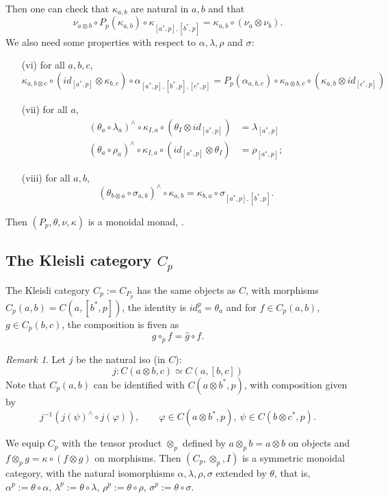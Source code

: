 \documentclass[12pt]{article}
\theoremstyle{definition}
\theoremstyle{remark}
\newtheorem{remark}{Remark}
\begin{document}
Then one can check that $\kappa_{a,b}$ are natural in $a,b$ and that 
\[
\nu_{a\otimes b}\circ P_p(\kappa_{a,b})\circ
\kappa_{[a^*,p],[b^*,p]}=\kappa_{a,b}\circ(\nu_a\otimes \nu_b).
\]
We also need some properties with respect to $\alpha,\lambda,\rho$ and $\sigma$:
\begin{enumerate}
\item[(vi)] for all $a,b,c$,
\[
\kappa_{a,b\otimes c}\circ
(id_{[a^*,p]}\otimes\kappa_{b,c})\circ\alpha_{[a^*,p],[b^*,p],[c^*,p]}=P_p(\alpha_{a,b,c})\circ\kappa_{a\otimes
b,c}\circ(\kappa_{a,b}\otimes id_{[c^*,p]})
\]
\item[(vii)] for all $a$,
\begin{align*}
(\theta_a\circ \lambda_a)^\wedge\circ \kappa_{I,a}\circ (\theta_I\otimes
id_{[a^*,p]})&=\lambda_{[a^*,p]}\\
(\theta_a\circ \rho_a)^\wedge\circ \kappa_{I,a}\circ (id_{[a^*,p]}\otimes
\theta_I)&=\rho_{[a^*,p]};
\end{align*}

\item[(viii)] for all $a,b$,
\[
(\theta_{b\otimes a}\circ \sigma_{a,b})^\wedge\circ \kappa_{a,b}=\kappa_{b,a}\circ
\sigma_{[a^*,p],[b^*,p]}.
\]
\end{enumerate}
Then $(P_p,\theta,\nu,\kappa)$ is a monoidal monad, \cite{seal2013tensors}. 

\subsection{The Kleisli category  $C_p$}

The Kleisli category $C_p:=C_{P_p}$ has the same objects as $C$, with morphisms
$C_p(a,b)=C(a, [b^*,p])$, the identity is $id^p_a=\theta_a$ and for $f\in C_p(a,b)$, $g\in
C_p(b,c)$, the composition is fiven as 
\[
g\circ_p f= \hat g\circ f.
\]
\begin{remark}
Let $j$ be the natural iso (in $C$):
\[
j: C(a\otimes b,c)\simeq C(a,[b,c])
\]
Note that  $C_p(a,b)$ can be identified with $C(a\otimes b^*,p)$, with composition given by
\[
j^{-1}(j(\psi)^\wedge\circ j(\varphi)),\qquad \varphi\in C(a\otimes b^*,p),\ \psi\in
C(b\otimes c^*,p).
\]
\end{remark}

We equip $C_p$ with the tensor product  $\otimes_p$ defined by $a\otimes_p b=a\otimes
b$ on objects and $f\otimes_p g=\kappa\circ(f\otimes g)$ on morphisms. 
Then  $(C_p,\otimes_p,I)$ is a symmetric monoidal category, with  the natural isomorphisms
$\alpha,\lambda,\rho,\sigma$ extended by $\theta$, that is,
$\alpha^p:=\theta\circ \alpha$, $\lambda^p:=\theta\circ \lambda$, $\rho^p:=\theta\circ
\rho$, $\sigma^p:=\theta\circ \sigma$.
\end{document}

